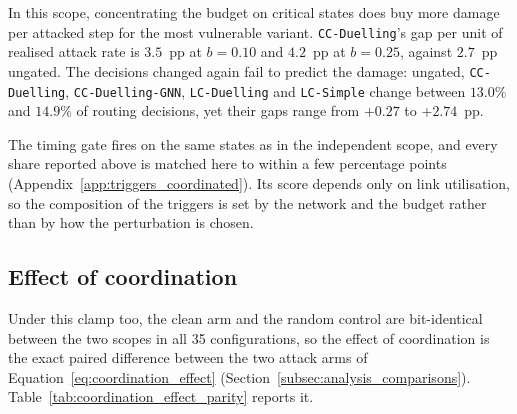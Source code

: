 In this scope, concentrating the budget on critical states does buy more damage per
attacked step for the most vulnerable variant. \texttt{CC-Duelling}'s gap per unit of
realised attack rate is $3.5$~pp at $b = 0.10$ and $4.2$~pp at $b = 0.25$, against
$2.7$~pp ungated. The decisions changed again fail to predict the damage: ungated,
\texttt{CC-Duelling}, \texttt{CC-Duelling-GNN}, \texttt{LC-Duelling} and
\texttt{LC-Simple} change between $13.0\%$ and $14.9\%$ of routing decisions, yet their
gaps range from $+0.27$ to $+2.74$~pp.

The timing gate fires on the same states as in the independent scope, and every share
reported above is matched here to within a few percentage points
(Appendix~\ref{app:triggers_coordinated}). Its score depends only on link utilisation,
so the composition of the triggers is set by the network and the budget rather than by
how the perturbation is chosen.

\subsection{Effect of coordination}
\label{subsec:results_parity_coordination_effect}

Under this clamp too, the clean arm and the random control are bit-identical between
the two scopes in all 35 configurations, so the effect of coordination is the exact
paired difference between the two attack arms of
Equation~\eqref{eq:coordination_effect} (Section~\ref{subsec:analysis_comparisons}).
Table~\ref{tab:coordination_effect_parity} reports it.


